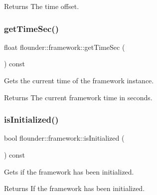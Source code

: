 \begin{DoxyReturn}{Returns}
The time offset. 
\end{DoxyReturn}
\mbox{\label{classflounder_1_1framework_aaf001b25a809bb91642a5c978e610169}} 
\subsubsection{\texorpdfstring{get\+Time\+Sec()}{getTimeSec()}}
{\footnotesize\ttfamily float flounder\+::framework\+::get\+Time\+Sec (\begin{DoxyParamCaption}{ }\end{DoxyParamCaption}) const\hspace{0.3cm}{\ttfamily [inline]}}



Gets the current time of the framework instance. 

\begin{DoxyReturn}{Returns}
The current framework time in seconds. 
\end{DoxyReturn}
\mbox{\label{classflounder_1_1framework_ad217b91b7e0f46f305105045396dcdf3}} 
\subsubsection{\texorpdfstring{is\+Initialized()}{isInitialized()}}
{\footnotesize\ttfamily bool flounder\+::framework\+::is\+Initialized (\begin{DoxyParamCaption}{ }\end{DoxyParamCaption}) const\hspace{0.3cm}{\ttfamily [inline]}}



Gets if the framework has been initialized. 

\begin{DoxyReturn}{Returns}
If the framework has been initialized. 
\end{DoxyReturn}
\mbox{\label{classflounder_1_1framework_a7e2584d7a3443c07b1d5eac2f44da14f}} 
